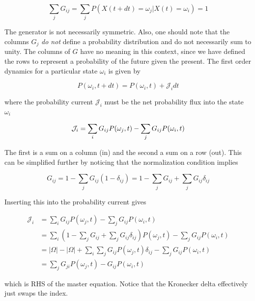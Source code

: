 \documentclass{ucetd}
\begin{document}
\begin{equation*}
\sum_{j}G_{ij} = \sum_{j} P(X(t+dt) = \omega_{j} | X(t) = \omega_{i}) = 1
\end{equation*}

The generator is not necessarily symmetric. Also, one should note that the columns $G_{j}$ \emph{do not} define a probability distribution and do not necessarily sum to unity. The columns of $G$ have no meaning in this context, since we have defined the rows to represent a probability of the future given the present. The first order dynamics for a particular state $\omega_{i}$ is given by


\begin{equation*}
P(\omega_{i},t+dt) = P(\omega_{i},t) + \mathcal{J}_{i}dt
\end{equation*}

where the probability current $\mathcal{J}_{i}$ must be the net probability flux into the state $\omega_{i}$

\begin{equation*}
\mathcal{J}_{i} = \sum_{i}G_{ij}P(\omega_{j},t) - \sum_{j}G_{ij}P(\omega_{i},t)\\
\end{equation*}

The first is a sum on a column (in) and the second a sum on a row (out). This can be simplified further by noticing that the normalization condition implies

\begin{equation*}
G_{ij} = 1 - \sum_{j}G_{ij}(1-\delta_{ij}) = 1 - \sum_{j}G_{ij} + \sum_{j}G_{ij}\delta_{ij}
\end{equation*}

Inserting this into the probability current gives

\begin{align*}
\mathcal{J}_{i} &= \sum_{i}G_{ij}P(\omega_{j},t) - \sum_{j}G_{ij}P(\omega_{i},t)\\
&= \sum_{i}\left(1 - \sum_{j}G_{ij} + \sum_{j}G_{ij}\delta_{ij}\right)P(\omega_{j},t) - \sum_{j}G_{ij}P(\omega_{i},t)\\
&= |\Omega| - |\Omega| + \sum_{i}\sum_{j}G_{ij}P(\omega_{j},t)\delta_{ij} - \sum_{j}G_{ij}P(\omega_{i},t)\\
&= \sum_{j}G_{ji}P(\omega_{j},t) - G_{ij}P(\omega_{i},t)
\end{align*}

which is RHS of the master equation. Notice that the Kronecker delta effectively just swaps the index. 
\end{document}
